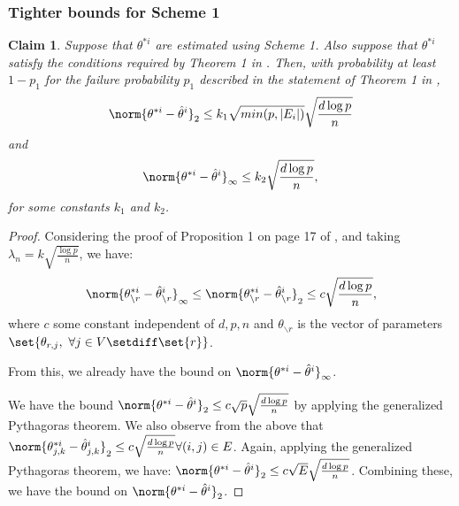\documentclass{article}
\newtheorem{claim}{Claim}
\def\edge{\ensuremath{E}}
\def\thetaEst{\hat{\theta}}
\begin{document}
\subsubsection{Tighter bounds for Scheme 1}
\begin{claim}
\label{lemGenParameterEstimateError}
Suppose that $\theta^{*i}$ are estimated using Scheme 1. Also suppose that $\theta^{*i}$ satisfy the conditions required by Theorem 1 in \cite{RWLIsing}. Then, with probability at least $1 - p_1$ for the failure probability $p_1$ described in the statement of Theorem 1 in \cite{RWLIsing}, $$\norm{\theta^{*i} - \thetaEst^{i}}_2 \leq k_1 \sqrt{min(p, |\edge_i|)}\sqrt{\frac{d \log p}{n}}$$
and
$$\norm{\theta^{*i} - \thetaEst^{i}}_{\infty} \leq k_2 \sqrt{\frac{d \log p}{n}},$$
for some constants $k_1$ and $k_2$.
\end{claim}
\begin{proof}
Considering the proof of Proposition 1 on page 17 of \cite{RWLIsing}, and taking $\lambda_n = k \sqrt{\frac{\log p}{n}}$, we have:
$$\norm{\theta_{\backslash r}^{*i} - \thetaEst_{\backslash r}^{i}}_{\infty} \leq \norm{\theta_{\backslash r}^{*i} - \thetaEst_{\backslash r}^{i}}_2 \leq c \sqrt{\frac{d \log p}{n}},$$ where $c$ some constant independent of $d, p, n$ and $\theta_{\backslash r}$ is the vector of parameters $\set{\theta_{r, j},\ \forall j \in V \setdiff \set{r}}$.

From this, we already have the bound on $\norm{\theta^{*i} - \thetaEst^{i}}_{\infty}$.

We have the bound $\norm{\theta^{*i} - \thetaEst^{i}}_2 \leq c \sqrt{p}\sqrt{\frac{d \log p}{n}}$ by applying the generalized Pythagoras theorem. We also observe from the above that $\norm{\theta_{j, k}^{*i} - \thetaEst_{j, k}^{i}}_2 \leq c \sqrt{\frac{d \log p}{n}} \forall (i, j) \in E$. Again, applying the generalized Pythagoras theorem, we have: $\norm{\theta^{*i} - \thetaEst^{i}}_2 \leq c \sqrt{E}\sqrt{\frac{d \log p}{n}}$. Combining these, we have the bound on $\norm{\theta^{*i} - \thetaEst^{i}}_2$.
\end{proof}
\end{document}
